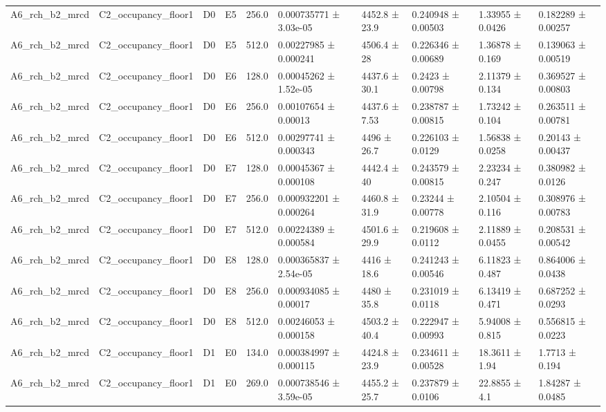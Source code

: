 \begin{table}
\begin{tabular}{llllllllll}
A6\_rch\_b2\_mrcd & C2\_occupancy\_floor1 & D0 & E5 & 256.0 & 0.000735771 ± 3.03e-05 & 4452.8 ± 23.9 & 0.240948 ± 0.00503 & 1.33955 ± 0.0426 & 0.182289 ± 0.00257 \\
A6\_rch\_b2\_mrcd & C2\_occupancy\_floor1 & D0 & E5 & 512.0 & 0.00227985 ± 0.000241 & 4506.4 ± 28 & 0.226346 ± 0.00689 & 1.36878 ± 0.169 & 0.139063 ± 0.00519 \\
A6\_rch\_b2\_mrcd & C2\_occupancy\_floor1 & D0 & E6 & 128.0 & 0.00045262 ± 1.52e-05 & 4437.6 ± 30.1 & 0.2423 ± 0.00798 & 2.11379 ± 0.134 & 0.369527 ± 0.00803 \\
A6\_rch\_b2\_mrcd & C2\_occupancy\_floor1 & D0 & E6 & 256.0 & 0.00107654 ± 0.00013 & 4437.6 ± 7.53 & 0.238787 ± 0.00815 & 1.73242 ± 0.104 & 0.263511 ± 0.00781 \\
A6\_rch\_b2\_mrcd & C2\_occupancy\_floor1 & D0 & E6 & 512.0 & 0.00297741 ± 0.000343 & 4496 ± 26.7 & 0.226103 ± 0.0129 & 1.56838 ± 0.0258 & 0.20143 ± 0.00437 \\
A6\_rch\_b2\_mrcd & C2\_occupancy\_floor1 & D0 & E7 & 128.0 & 0.00045367 ± 0.000108 & 4442.4 ± 40 & 0.243579 ± 0.00815 & 2.23234 ± 0.247 & 0.380982 ± 0.0126 \\
A6\_rch\_b2\_mrcd & C2\_occupancy\_floor1 & D0 & E7 & 256.0 & 0.000932201 ± 0.000264 & 4460.8 ± 31.9 & 0.23244 ± 0.00778 & 2.10504 ± 0.116 & 0.308976 ± 0.00783 \\
A6\_rch\_b2\_mrcd & C2\_occupancy\_floor1 & D0 & E7 & 512.0 & 0.00224389 ± 0.000584 & 4501.6 ± 29.9 & 0.219608 ± 0.0112 & 2.11889 ± 0.0455 & 0.208531 ± 0.00542 \\
A6\_rch\_b2\_mrcd & C2\_occupancy\_floor1 & D0 & E8 & 128.0 & 0.000365837 ± 2.54e-05 & 4416 ± 18.6 & 0.241243 ± 0.00546 & 6.11823 ± 0.487 & 0.864006 ± 0.0438 \\
A6\_rch\_b2\_mrcd & C2\_occupancy\_floor1 & D0 & E8 & 256.0 & 0.000934085 ± 0.00017 & 4480 ± 35.8 & 0.231019 ± 0.0118 & 6.13419 ± 0.471 & 0.687252 ± 0.0293 \\
A6\_rch\_b2\_mrcd & C2\_occupancy\_floor1 & D0 & E8 & 512.0 & 0.00246053 ± 0.000158 & 4503.2 ± 40.4 & 0.222947 ± 0.00993 & 5.94008 ± 0.815 & 0.556815 ± 0.0223 \\
A6\_rch\_b2\_mrcd & C2\_occupancy\_floor1 & D1 & E0 & 134.0 & 0.000384997 ± 0.000115 & 4424.8 ± 23.9 & 0.234611 ± 0.00528 & 18.3611 ± 1.94 & 1.7713 ± 0.194 \\
A6\_rch\_b2\_mrcd & C2\_occupancy\_floor1 & D1 & E0 & 269.0 & 0.000738546 ± 3.59e-05 & 4455.2 ± 25.7 & 0.237879 ± 0.0106 & 22.8855 ± 4.1 & 1.84287 ± 0.0485 \\

\end{tabular}
\end{table}
